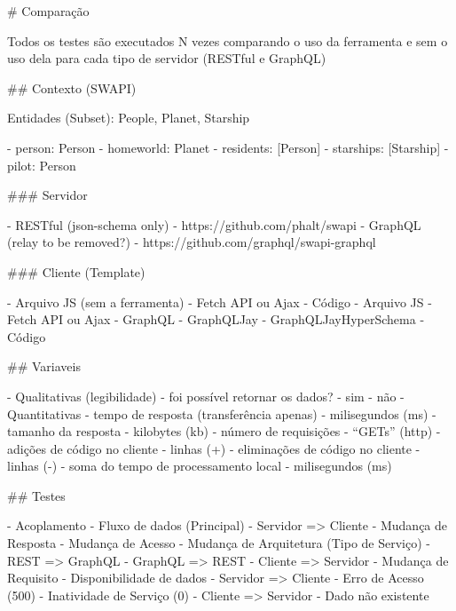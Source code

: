 # Comparação

Todos os testes são executados N vezes comparando o uso da ferramenta e sem o uso dela para cada tipo de servidor (RESTful e GraphQL)

## Contexto (SWAPI)

Entidades (Subset): People, Planet, Starship

- person: Person
	- homeworld: Planet
		- residents: [Person]
	- starships: [Starship]
		- pilot: Person

### Servidor

- RESTful (json-schema only)
	- https://github.com/phalt/swapi
- GraphQL (relay to be removed?)
	- https://github.com/graphql/swapi-graphql

### Cliente (Template)

- Arquivo JS (sem a ferramenta)
	- Fetch API ou Ajax
	- Código
- Arquivo JS
	- Fetch API ou Ajax
	- GraphQL
	- GraphQLJay
	- GraphQLJayHyperSchema
	- Código

## Variaveis

- Qualitativas (legibilidade)
	- foi possível retornar os dados?
		- sim
		- não
- Quantitativas
	- tempo de resposta (transferência apenas)
		- milisegundos (ms)
	- tamanho da resposta
		- kilobytes (kb)
	- número de requisições
		- “GETs” (http)
	- adições de código no cliente
		- linhas (+)
	- eliminações de código no cliente
		- linhas (-)
	- soma do tempo de processamento local
		- milisegundos (ms)

## Testes

- Acoplamento
	- Fluxo de dados (Principal)
		- Servidor => Cliente
			- Mudança de Resposta
			- Mudança de Acesso
			- Mudança de Arquitetura (Tipo de Serviço)
				- REST => GraphQL
				- GraphQL => REST
		- Cliente => Servidor
			- Mudança de Requisito
	- Disponibilidade de dados
		- Servidor => Cliente
			- Erro de Acesso (500)
			- Inatividade de Serviço (0)
		- Cliente => Servidor
			- Dado não existente
